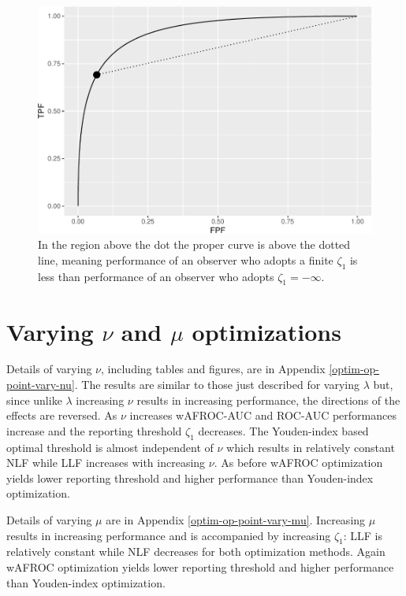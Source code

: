 \documentclass[
]{book}
\begin{document}
\begin{figure}
\centering
\includegraphics{21-optim-op-point_files/figure-latex/binormal-model-threshold-dependence-2-1.pdf}
\caption{\label{fig:binormal-model-threshold-dependence-2}In the region above the dot the proper curve is above the dotted line, meaning performance of an observer who adopts a finite \(\zeta_1\) is less than performance of an observer who adopts \(\zeta_1 = -\infty\).}
\end{figure}

\hypertarget{optim-op-point-vary-nu-mu}{%
\section{\texorpdfstring{Varying \(\nu\) and \(\mu\) optimizations}{Varying \textbackslash nu and \textbackslash mu optimizations}}\label{optim-op-point-vary-nu-mu}}

Details of varying \(\nu\), including tables and figures, are in Appendix \ref{optim-op-point-vary-nu}. The results are similar to those just described for varying \(\lambda\) but, since unlike \(\lambda\) increasing \(\nu\) results in increasing performance, the directions of the effects are reversed. As \(\nu\) increases wAFROC-AUC and ROC-AUC performances increase and the reporting threshold \(\zeta_1\) decreases. The Youden-index based optimal threshold is almost independent of \(\nu\) which results in relatively constant NLF while LLF increases with increasing \(\nu\). As before wAFROC optimization yields lower reporting threshold and higher performance than Youden-index optimization.

Details of varying \(\mu\) are in Appendix \ref{optim-op-point-vary-mu}. Increasing \(\mu\) results in increasing performance and is accompanied by increasing \(\zeta_1\): LLF is relatively constant while NLF decreases for both optimization methods. Again wAFROC optimization yields lower reporting threshold and higher performance than Youden-index optimization.
\end{document}
